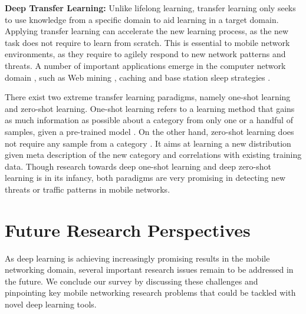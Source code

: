 \documentclass[journal,comsoc,letter]{IEEEtran}
\begin{document}
\noindent \textbf{Deep Transfer Learning:} Unlike lifelong learning, transfer learning only seeks to use knowledge from a specific domain to aid learning in a target domain. Applying transfer learning can accelerate the new learning process, as the new task does not require to learn from scratch. This is essential to mobile network environments, as they require to agilely respond to new network patterns and threats. A number of important applications emerge in the computer network domain \cite{valente2017survey}, such as Web mining \cite{lopez2018deep}, caching \cite{bacstuug2015transfer} and base station sleep strategies \cite{li2014tact}. 

There exist two extreme transfer learning paradigms, namely one-shot learning and zero-shot learning. One-shot learning refers to a learning method that gains as much information as possible about a category from only one or a handful of samples, given a pre-trained model \cite{fei2006one}. On the other hand, zero-shot learning does not require any sample from a category \cite{palatucci2009zero}. It aims at learning a new distribution given meta description of the new category and correlations with existing training data. Though research towards deep one-shot learning \cite{rezende2016one, vinyals2016matching} and deep zero-shot learning \cite{changpinyo2016synthesized, oh2017zero} is in its infancy, both paradigms are very promising in detecting new threats or traffic patterns in mobile networks.







\section{Future Research Perspectives}\label{sec:future}
As deep learning is achieving increasingly promising results in the mobile networking domain, several important research issues remain to be addressed in the future. We conclude our survey by discussing these challenges and pinpointing key mobile networking research problems that could be tackled with novel deep learning tools. 
\end{document}
